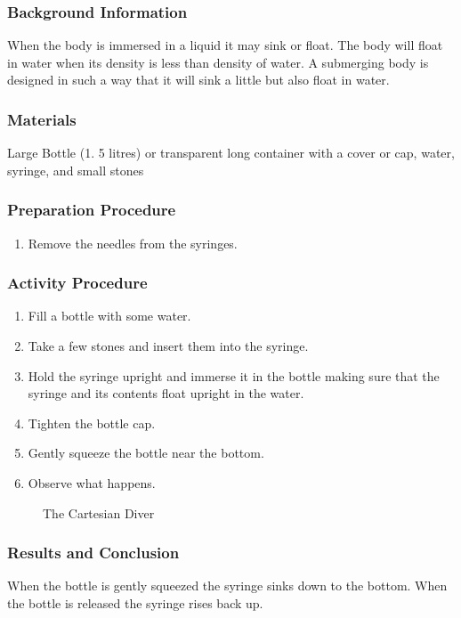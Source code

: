 \subsubsection*{Background Information}
When the body is immersed in a liquid it may sink or float. The body will float in water when its density is less than density of water. A submerging body is designed in such a way that it will sink a little but also float in water. 

\subsubsection*{Materials}
Large Bottle (1. 5 litres) or transparent long container with a cover or cap, water, syringe, and small stones

\subsubsection*{Preparation Procedure}
\begin{enumerate}
\item{Remove the needles from the syringes.}
\end{enumerate}

\subsubsection*{Activity Procedure}
\begin{enumerate}
\item{Fill a bottle with some water.}
\item{Take a few stones and insert them into the syringe.}
\item{Hold the syringe upright and immerse it in the bottle making sure that the syringe and its contents float upright in the water.}
\item{Tighten the bottle cap.}
\item{Gently squeeze the bottle near the bottom.} 
\item{Observe what happens.}
\end{enumerate}

\begin{figure}
\begin{center}
\def\svgwidth{2cm}

\caption{The Cartesian Diver}
\label{fig:cartesian-diver}
\end{center}
\end{figure}

\subsubsection*{Results and Conclusion}
When the bottle is gently squeezed the syringe sinks down to the bottom. When the bottle is released the syringe rises back up. 

